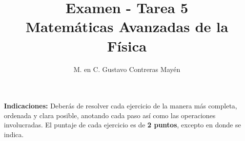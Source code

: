 
\usepackage{apacite}
\title{Examen - Tarea 5 \\[0.3em]  \large{Matemáticas Avanzadas de la Física}\vspace{-3ex}}
\author{M. en C. Gustavo Contreras Mayén}
\date{ }

\vspace{-4cm}
\maketitle
\fontsize{14}{14}\selectfont

\textbf{Indicaciones: } Deberás de resolver cada ejercicio de la manera más completa, ordenada y clara posible, anotando cada paso así como las operaciones involucradas. El puntaje de cada ejercicio es de \textbf{2 puntos}, excepto en donde se indica.

